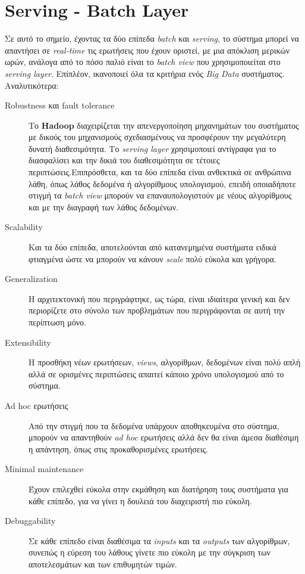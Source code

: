 \section{Serving - Batch Layer}
Σε αυτό το σημείο, έχοντας τα δύο επίπεδα \textit{batch} και \textit{serving}, το σύστημα μπορεί να απαντήσει σε \textit{real-time} τις ερωτήσεις που έχουν οριστεί, με μια απόκλιση μερικών ωρών, ανάλογα από το πόσο παλιό είναι το \textit{batch view} που χρησιμοποιείται στο \textit{serving layer}. Επίπλέον, ικανοποιεί όλα τα κριτήρια ενός \textit{Big Data} συστήματος. Αναλυτικότερα:
\begin{description}
\item[Robustness και fault tolerance] Το \textbf{Hadoop} διαχειρίζεται την απενεργοποίηση μηχανημάτων του συστήματος με δικούς του μηχανισμούς σχεδιασμένους να προσφέρουν την μεγαλύτερη δυνατή διαθεσιμότητα. Το \textit{serving layer} χρησιμοποιεί αντίγραφα για το διασφαλίσει και την δικιά του διαθεσιμότητα σε τέτοιες περιπτώσεις.Επιπρόσθετα, και τα δύο επίπεδα είναι ανθεκτικά σε ανθρώπινα λάθη, όπως λάθος δεδομένα ή αλγορίθμους υπολογισμού, επειδή οποιαδήποτε στιγμή τα \textit{batch view} μπορούν να επαναυπολογιστούν με νέους αλγορίθμους και με την διαγραφή των λάθος δεδομένων.
\item [Scalability] Και τα δύο επίπεδα, αποτελούνται από κατανεμημένα συστήματα ειδικά φτιαγμένα ώστε να μπορούν να κάνουν \textit{scale} πολύ εύκολα και γρήγορα.
\item[Generalization] Η αρχιτεκτονική που περιγράφτηκε, ως τώρα, είναι ιδιαίτερα γενική και δεν περιορίζετε στο σύνολο των προβλημάτων που περιγράφονται σε αυτή την περίπτωση μόνο.
\item [Extensibility] Η προσθήκη νέων ερωτήσεων, \textit{views}, αλγορίθμων, δεδομένων είναι πολύ απλή αλλά σε ορισμένες περιπτώσεις απαιτεί κάποιο χρόνο υπολογισμού από το σύστημα.
\item [Ad hoc ερωτήσεις] Από την στιγμή που τα δεδομένα υπάρχουν αποθηκευμένα στο σύστημα, μπορούν να απαντηθούν \textit{ad hoc} ερωτήσεις αλλά δεν θα είναι άμεσα διαθέσιμη η απάντηση, όπως στις προκαθορισμένες ερωτήσεις.
\item [Minimal maintenance] Έχουν επιλεχθεί εύκολα στην εκμάθηση και διατήρηση τους συστήματα για κάθε επίπεδο, για να γίνει η δουλειά του διαχειριστή πιο εύκολη.
\item [Debuggability] Σε κάθε επίπεδο είναι διαθέσιμα τα \textit{inputs} και τα \textit{outputs} των αλγορίθμων, συνεπώς η εύρεση του λάθους γίνετε πιο εύκολη με την σύγκριση των αποτελεσμάτων και των επιθυμητών τιμών.
\end{description}


